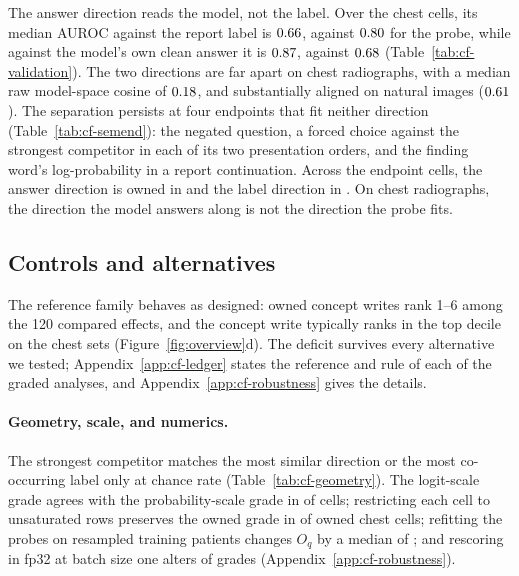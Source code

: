 \documentclass{article}
\begin{document}
The answer direction reads the model, not the label. Over the \cfValAurocAnsChestN{} chest cells, its median AUROC against the report label is $0.66$, against $0.80$ for the probe, while against the model's own clean answer it is $0.87$, against $0.68$ (Table~\ref{tab:cf-validation}). The two directions are far apart on chest radiographs, with a median raw model-space cosine of $0.18$, and substantially aligned on natural images ($0.61$). The separation persists at four endpoints that fit neither direction (Table~\ref{tab:cf-semend}): the negated question, a forced choice against the strongest competitor in each of its two presentation orders, and the finding word's log-probability in a report continuation. Across the \cfSemCells{} endpoint cells, the answer direction is owned in \cfSemAnswerOwned{} and the label direction in \cfSemLabelOwned{}. On chest radiographs, the direction the model answers along is not the direction the probe fits.

\subsection{Controls and alternatives}
\label{sec:controls}

The reference family behaves as designed: owned concept writes rank 1--6 among the 120 compared effects, and the concept write typically ranks in the top decile on the chest sets (Figure~\ref{fig:overview}d). The deficit survives every alternative we tested; Appendix~\ref{app:cf-ledger} states the reference and rule of each of the \cfLedgerAnalyses{} graded analyses, and Appendix~\ref{app:cf-robustness} gives the details.
\label{sec:robust-geometry}

\paragraph{Geometry, scale, and numerics.} The strongest competitor matches the most similar direction or the most co-occurring label only at chance rate (Table~\ref{tab:cf-geometry}). The logit-scale grade agrees with the probability-scale grade in \cfScaleAgree{} of \cfScaleAgreeN{} cells; restricting each cell to unsaturated rows preserves the owned grade in \cfScaleUnsatGradeKept{} of \cfScaleUnsatGradeN{} owned chest cells; refitting the probes on resampled training patients changes $O_q$ by a median of \cfScaleRefitMedian{}; and rescoring in fp32 at batch size one alters \cfPrecisionGradeChanges{} of \cfPrecisionGradeCells{} grades (Appendix~\ref{app:cf-robustness}).
\end{document}
